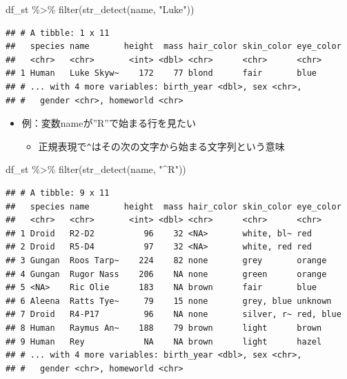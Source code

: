 \documentclass[
  xelatex,ja=standard, b5paper]{bxjsbook}
\newenvironment{Shaded}{\begin{snugshade}}{\end{snugshade}}
\newcommand{\FunctionTok}[1]{\textcolor[rgb]{0.00,0.00,0.00}{#1}}
\newcommand{\NormalTok}[1]{#1}
\newcommand{\SpecialCharTok}[1]{\textcolor[rgb]{0.00,0.00,0.00}{#1}}
\newcommand{\StringTok}[1]{\textcolor[rgb]{0.31,0.60,0.02}{#1}}
\providecommand{\tightlist}{%
  \setlength{\itemsep}{0pt}\setlength{\parskip}{0pt}}
\begin{document}
\begin{Shaded}
\begin{Highlighting}[]
\NormalTok{df\_st }\SpecialCharTok{\%\textgreater{}\%}
  \FunctionTok{filter}\NormalTok{(}\FunctionTok{str\_detect}\NormalTok{(name, }\StringTok{"Luke"}\NormalTok{))}
\end{Highlighting}
\end{Shaded}

\begin{verbatim}
## # A tibble: 1 x 11
##   species name       height  mass hair_color skin_color eye_color
##   <chr>   <chr>       <int> <dbl> <chr>      <chr>      <chr>    
## 1 Human   Luke Skyw~    172    77 blond      fair       blue     
## # ... with 4 more variables: birth_year <dbl>, sex <chr>,
## #   gender <chr>, homeworld <chr>
\end{verbatim}

\begin{itemize}
\tightlist
\item
  例：変数nameが''R''で始まる行を見たい

  \begin{itemize}
  \tightlist
  \item
    正規表現で\texttt{\^{}}はその次の文字から始まる文字列という意味
  \end{itemize}
\end{itemize}

\begin{Shaded}
\begin{Highlighting}[]
\NormalTok{df\_st }\SpecialCharTok{\%\textgreater{}\%}
  \FunctionTok{filter}\NormalTok{(}\FunctionTok{str\_detect}\NormalTok{(name, }\StringTok{"\^{}R"}\NormalTok{))}
\end{Highlighting}
\end{Shaded}

\begin{verbatim}
## # A tibble: 9 x 11
##   species name       height  mass hair_color skin_color eye_color
##   <chr>   <chr>       <int> <dbl> <chr>      <chr>      <chr>    
## 1 Droid   R2-D2          96    32 <NA>       white, bl~ red      
## 2 Droid   R5-D4          97    32 <NA>       white, red red      
## 3 Gungan  Roos Tarp~    224    82 none       grey       orange   
## 4 Gungan  Rugor Nass    206    NA none       green      orange   
## 5 <NA>    Ric Olie      183    NA brown      fair       blue     
## 6 Aleena  Ratts Tye~     79    15 none       grey, blue unknown  
## 7 Droid   R4-P17         96    NA none       silver, r~ red, blue
## 8 Human   Raymus An~    188    79 brown      light      brown    
## 9 Human   Rey            NA    NA brown      light      hazel    
## # ... with 4 more variables: birth_year <dbl>, sex <chr>,
## #   gender <chr>, homeworld <chr>
\end{verbatim}
\end{document}
